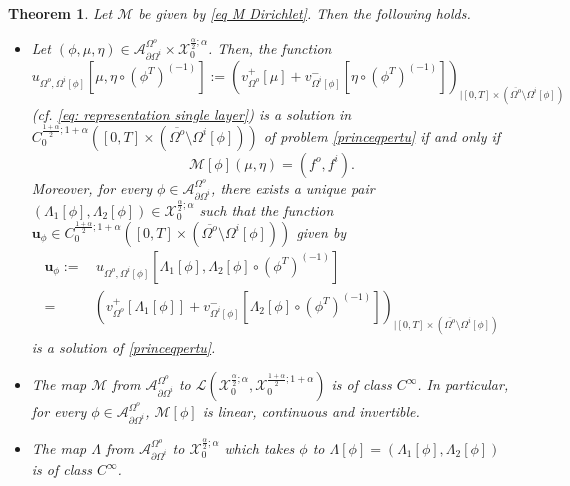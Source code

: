 \documentclass[11pt,reqno,a4paper]{amsart}
\theoremstyle{plain}
\newtheorem{theorem}{Theorem}[section]
\theoremstyle{definition}
\begin{document}
\begin{theorem}\label{sec 5: thm recall dir}
Let $\mathcal{M}$ be given by \eqref{eq M Dirichlet}. Then the following holds.
\begin{itemize}
    \item[(i)] Let $(\phi,\mu, \eta) \in \mathcal{A}^{\Omega^o}_{\partial\Omega^i} \times \mathcal{X}_0^{\frac{\alpha}{2}; \alpha}$. Then, the function 
    \[
    u_{\Omega^o,\Omega^i[\phi]}\left[\mu,\eta\circ (\phi^T)^{(-1)}\right] := \left( v^+_{\Omega^o} [\mu] + v^-_{\Omega^i[\phi]} \left[\eta\circ (\phi^T)^{(-1)}\right] \right)_{| [0,T] \times (\overline{\Omega^o} \setminus {\Omega^i[\phi]})} 
    \]
    (cf. \eqref{eq: representation single layer}) is a solution in $C_{0}^{\frac{1+\alpha}{2}; 1+\alpha}([0,T] \times (\overline{\Omega^o} \setminus \Omega^i[\phi]))$ of problem \eqref{princeqpertu} if and only if 
    \begin{equation*}
    \mathcal{M}[\phi](\mu, \eta) = (f^o,f^i).
    \end{equation*}
    Moreover, for every $\phi \in \mathcal{A}^{\Omega^o}_{\partial\Omega^i}$, there exists a unique pair $(\Lambda_1[\phi],\Lambda_2[\phi]) \in \mathcal{X}_0^{\frac{\alpha}{2}; \alpha}$ such that 
    the function $\mathbf{u}_\phi \in C_{0}^{\frac{1+\alpha}{2}; 1+\alpha}([0,T] \times (\overline{\Omega^o} \setminus \Omega^i[\phi] ))$ given by
    \begin{equation*}
    \begin{split}
        \mathbf{u}_{\phi} :=& \,u_{\Omega^o,\Omega^i[\phi]}\left[\Lambda_1[\phi],\Lambda_2[\phi]\circ (\phi^T)^{(-1)}\right] 
        \\
        =&\left( v^+_{\Omega^o} [\Lambda_1[\phi]] + v^-_{\Omega^i[\phi]}
        \left[\Lambda_2[\phi]\circ (\phi^T)^{(-1)}\right] \right)_{| [0,T] \times (\overline{\Omega^o} \setminus {\Omega^i[\phi]})}
    \end{split}
    \end{equation*}
    is a solution of \eqref{princeqpertu}.

    \item[(ii)] The map $\mathcal{M}$ from $\mathcal{A}^{\Omega^o}_{\partial\Omega^i}$ to $\mathcal{L} \left( \mathcal{X}_0^{\frac{\alpha}{2}; \alpha}, \mathcal{X}_0^{\frac{1+\alpha}{2}; 1+\alpha} \right)$ is of class $C^{\infty}$. In particular, for every $\phi \in \mathcal{A}^{\Omega^o}_{\partial\Omega^i}$, $\mathcal{M}[\phi]$ is linear, continuous and invertible.

    \item[(iii)] The map $\Lambda$ from $\mathcal{A}^{\Omega^o}_{\partial\Omega^i}$ to $\mathcal{X}_0^{\frac{\alpha}{2}; \alpha}$ which takes $\phi$ to $\Lambda[\phi] = (\Lambda_1[\phi],\Lambda_2[\phi])$ is of class $C^{\infty}$.
    \end{itemize}
\end{theorem}
\end{document}
